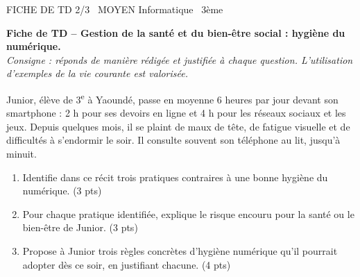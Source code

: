 \documentclass[11pt]{article}
\begin{document}
\begin{tcolorbox}[enhanced,colback=popink,colframe=popink,arc=10pt,boxrule=0pt,left=12pt,right=12pt,top=9pt,bottom=9pt]
{\color{white}\popxbold\small FICHE DE TD 2/3 \textbullet\ MOYEN \hfill Informatique \textbullet\ 3ème\par}
\end{tcolorbox}
\vspace{4pt}
\textbf{Fiche de TD -- Gestion de la santé et du bien-être social : hygiène du numérique.}\\
\textit{Consigne : réponds de manière rédigée et justifiée à chaque question. L'utilisation d'exemples de la vie courante est valorisée.}

\begin{exercice}
Junior, élève de 3\textsuperscript{e} à Yaoundé, passe en moyenne 6 heures par jour devant son smartphone : 2 h pour ses devoirs en ligne et 4 h pour les réseaux sociaux et les jeux. Depuis quelques mois, il se plaint de maux de tête, de fatigue visuelle et de difficultés à s'endormir le soir. Il consulte souvent son téléphone au lit, jusqu'à minuit.
\begin{enumerate}
\item Identifie dans ce récit trois pratiques contraires à une bonne hygiène du numérique. (3 pts)
\item Pour chaque pratique identifiée, explique le risque encouru pour la santé ou le bien-être de Junior. (3 pts)
\item Propose à Junior trois règles concrètes d'hygiène numérique qu'il pourrait adopter dès ce soir, en justifiant chacune. (4 pts)
\end{enumerate}
\end{exercice}
\end{document}

